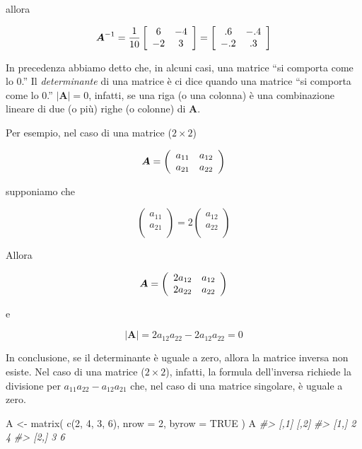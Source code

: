\documentclass[
  11pt,
]{krantz}
\makeatletter
\newenvironment{Shaded}{\begin{snugshade}}{\end{snugshade}}
\newcommand{\AttributeTok}[1]{\textcolor[rgb]{0.61,0.61,0.61}{#1}}
\newcommand{\CommentTok}[1]{\textcolor[rgb]{0.37,0.37,0.37}{\textit{#1}}}
\newcommand{\ConstantTok}[1]{\textcolor[rgb]{0,0,0}{#1}}
\newcommand{\DecValTok}[1]{\textcolor[rgb]{0.06,0.06,0.06}{#1}}
\newcommand{\FunctionTok}[1]{\textcolor[rgb]{0,0,0}{#1}}
\newcommand{\NormalTok}[1]{#1}
\newcommand{\OtherTok}[1]{\textcolor[rgb]{0.37,0.37,0.37}{#1}}
\newenvironment{kframe}{%
\medskip{}
\setlength{\fboxsep}{.8em}
 \def\at@end@of@kframe{}%
 \ifinner\ifhmode%
  \def\at@end@of@kframe{\end{minipage}}%
  \begin{minipage}{\columnwidth}%
 \fi\fi%
 \def\FrameCommand##1{\hskip\@totalleftmargin \hskip-\fboxsep
 \colorbox{shadecolor}{##1}\hskip-\fboxsep
     \hskip-\linewidth \hskip-\@totalleftmargin \hskip\columnwidth}%
 \MakeFramed {\advance\hsize-\width
   \@totalleftmargin\z@ \linewidth\hsize
   \@setminipage}}%
 {\par\unskip\endMakeFramed%
 \at@end@of@kframe}
\renewenvironment{Shaded}{\begin{kframe}}{\end{kframe}}
\theoremstyle{definition}
\theoremstyle{definition}
\theoremstyle{definition}
\theoremstyle{definition}
\theoremstyle{remark}
\makeatother
\begin{document}
allora

\[
\boldsymbol{A}^{-1} = \frac{1}{10} \left[
\begin{array}{c c}
6 & -4 \\
-2 & 3
\end{array}
\right]= \left[ \begin{array}{c c}
.6 & -.4 \\
-.2 & .3
\end{array}
 \right]
 \]

In precedenza abbiamo detto che, in alcuni casi, una matrice ``si comporta come lo 0.'' Il \emph{determinante} di una matrice è ci dice quando una matrice ``si comporta come lo 0.'' \(|\boldsymbol{A}| = 0\), infatti, se una riga (o una colonna) è una combinazione lineare di due (o più) righe (o colonne) di \(\boldsymbol{A}\).

Per esempio, nel caso di una matrice (\(2 \times 2\))

\[
\boldsymbol{A} =  \left( \begin{array}{c c}
a_{11}& a_{12} \\
a_{21} & a_{22} \end{array} \right)
\]

supponiamo che

\[
\left(%
\begin{array}{c}
  a_{11} \\
  a_{21} \\
\end{array}%
\right)=2
\left(%
\begin{array}{c}
  a_{12} \\
  a_{22} \\
\end{array}%
\right)\]

Allora

\[
\boldsymbol{A} =  \left( \begin{array}{c c}
2a_{12}& a_{12} \\
2a_{22} & a_{22} \end{array} \right)
\]

e

\[
|\boldsymbol{A}| = 2a_{12}a_{22}-2a_{12}a_{22}=0
\]

In conclusione, se il determinante è uguale a zero, allora la matrice inversa non esiste. Nel caso di una matrice (\(2 \times 2\)), infatti, la formula dell'inversa richiede la divisione per \(a_{11}a_{22}-a_{12}a_{21}\) che, nel caso di una matrice singolare, è uguale a zero.

\begin{Shaded}
\begin{Highlighting}[]
\NormalTok{A }\OtherTok{\textless{}{-}} \FunctionTok{matrix}\NormalTok{(}
  \FunctionTok{c}\NormalTok{(}\DecValTok{2}\NormalTok{, }\DecValTok{4}\NormalTok{, }\DecValTok{3}\NormalTok{, }\DecValTok{6}\NormalTok{),}
  \AttributeTok{nrow =} \DecValTok{2}\NormalTok{,}
  \AttributeTok{byrow =} \ConstantTok{TRUE}
\NormalTok{)}
\NormalTok{A}
\CommentTok{\#\textgreater{}      [,1] [,2]}
\CommentTok{\#\textgreater{} [1,]    2    4}
\CommentTok{\#\textgreater{} [2,]    3    6}
\end{Highlighting}
\end{Shaded}
\end{document}
